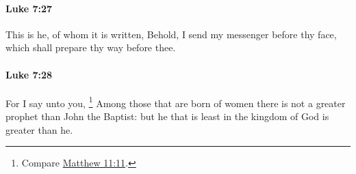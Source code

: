 		\paragraph{Luke 7:27} %
			\label{LUKE-7-27}

			This is he, of whom it is written, Behold, I send my messenger before thy face, which shall prepare thy way before thee.

			\begin{framed}
			\scriptsize
				\begin{compactdesc}
					\item[SBLG] 
				\end{compactdesc}
			\end{framed}

		\paragraph{Luke 7:28} %
			\label{LUKE-7-28}

			For I say unto you,
				\footnote{%
					Compare \hyperref[MATTHEW-11-11]{Matthew 11:11}.
					}%
			Among those that are born of women there is not a greater prophet than John the Baptist: but he that is least in the kingdom of God is greater than he.

